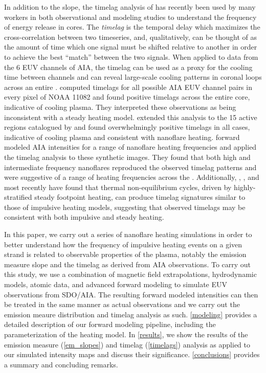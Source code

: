 In addition to the \dem{} slope, the timelag analysis of \citet{viall_evidence_2012} has recently been used by many workers in both observational and modeling studies to understand the frequency of energy release in \AR{} cores. The \textit{timelag} is the temporal delay which maximizes the cross-correlation between two timeseries, and, qualitatively, can be thought of as the amount of time which one signal must be shifted relative to another in order to achieve the best ``match'' between the two signals. When applied to data from the 6 EUV channels of AIA, the timelag can be used as a proxy for the cooling time between channels and can reveal large-scale cooling patterns in coronal loops across an entire \AR{}. \citeauthor{viall_evidence_2012} computed timelags for all possible AIA EUV channel pairs in every pixel of \AR{} NOAA 11082 and found positive timelags across the entire \AR{} core, indicative of cooling plasma. They interpreted these observations as being inconsistent with a steady heating model. \citet{viall_survey_2017} extended this analysis to the 15 active regions catalogued by \citet{warren_systematic_2012} and found overwhelmingly positive timelags in all cases, indicative of cooling plasma and consistent with nanoflare heating. \citet{bradshaw_patterns_2016} forward modeled AIA intensities for a range of nanoflare heating frequencies and applied the timelag analysis to these synthetic images. They found that both high and intermediate frequency nanoflares reproduced the observed timelag patterns and were suggestive of a range of heating frequencies across the \AR{}.  Additionally, \citet{lionello_can_2016}, \citet{winebarger_investigation_2016}, and most recently \citet{winebarger_identifying_2018} have found that thermal non-equilibrium cycles, driven by highly-stratified steady footpoint heating, can produce timelag signatures similar to those of impulsive heating models, suggesting that observed timelags may be consistent with both impulsive and steady heating. 

In this paper, we carry out a series of nanoflare heating simulations in order to better understand how the frequency of impulsive heating events on a given strand is related to observable properties of the plasma, notably the emission measure slope and the timelag as derived from AIA observations. To carry out this study, we use a combination of magnetic field extrapolations, hydrodynamic models, atomic data, and advanced forward modeling to simulate EUV observations from SDO/AIA. The resulting forward modeled intensities can then be treated in the same manner as actual observations and we carry out the emission meaure distribution and timelag analysis as such. \autoref{modeling} provides a detailed description of our forward modeling pipeline, including the parameterization of the heating model. In \autoref{results}, we show the results of the emission measure (\autoref{em_slopes}) and timelag (\autoref{timelags}) analysis as applied to our simulated intensity maps and discuss their significance. \autoref{conclusions} provides a summary and concluding remarks.

